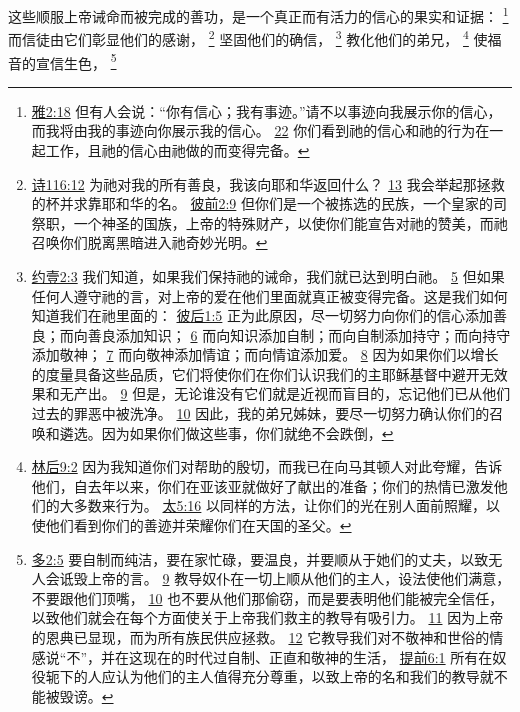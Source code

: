 \documentclass[12pt, a4paper, oneside]{ctexart}
\newcounter{parnum}[section]
\newcommand{\N}{%
   \noindent\refstepcounter{parnum}%
    \makebox[\parindent][l]{\textbf{\arabic{parnum}.}}}
\begin{document}
\N 这些顺服上帝诫命而被完成的善功，是一个真正而有活力的信心的果实和证据：
	\footnote {
		\href{https://biblehub.com/james/2-18.htm}{雅2:18} 但有人会说：“你有信心；我有事迹。”请不以事迹向我展示你的信心，而我将由我的事迹向你展示我的信心。
		\href{https://biblehub.com/james/2-22.htm}{22} 你们看到祂的信心和祂的行为在一起工作，且祂的信心由祂做的而变得完备。
	}
	而信徒由它们彰显他们的感谢，
	\footnote {
		\href{https://biblehub.com/psalms/116-12.htm}{诗116:12} 为祂对我的所有善良，我该向耶和华返回什么？
		\href{https://biblehub.com/psalms/116-13.htm}{13} 我会举起那拯救的杯并求靠耶和华的名。
		\href{https://biblehub.com/1_peter/2-9.htm}{彼前2:9} 但你们是一个被拣选的民族，一个皇家的司祭职，一个神圣的国族，上帝的特殊财产，以使你们能宣告对祂的赞美，而祂召唤你们脱离黑暗进入祂奇妙光明。
	}
	坚固他们的确信，
	\footnote {
		\href{https://biblehub.com/1_john/2-3.htm}{约壹2:3} 我们知道，如果我们保持祂的诫命，我们就已达到明白祂。
		\href{https://biblehub.com/1_john/2-5.htm}{5} 但如果任何人遵守祂的言，对上帝的爱在他们里面就真正被变得完备。这是我们如何知道我们在祂里面的：
		\href{https://biblehub.com/2_peter/1-5.htm}{彼后1:5} 正为此原因，尽一切努力向你们的信心添加善良；而向善良添加知识；
		\href{https://biblehub.com/2_peter/1-6.htm}{6} 而向知识添加自制；而向自制添加持守；而向持守添加敬神；
		\href{https://biblehub.com/2_peter/1-7.htm}{7} 而向敬神添加情谊；而向情谊添加爱。
		\href{https://biblehub.com/2_peter/1-8.htm}{8} 因为如果你们以增长的度量具备这些品质，它们将使你们在你们认识我们的主耶稣基督中避开无效果和无产出。
		\href{https://biblehub.com/2_peter/1-9.htm}{9} 但是，无论谁没有它们就是近视而盲目的，忘记他们已从他们过去的罪恶中被洗净。
		\href{https://biblehub.com/2_peter/1-10.htm}{10} 因此，我的弟兄姊妹，要尽一切努力确认你们的召唤和遴选。因为如果你们做这些事，你们就绝不会跌倒，
	}
	教化他们的弟兄，
	\footnote {
		\href{https://biblehub.com/2_corinthians/9-2.htm}{林后9:2} 因为我知道你们对帮助的殷切，而我已在向马其顿人对此夸耀，告诉他们，自去年以来，你们在亚该亚就做好了献出的准备；你们的热情已激发他们的大多数来行为。
		\href{https://biblehub.com/matthew/5-16.htm}{太5:16} 以同样的方法，让你们的光在别人面前照耀，以使他们看到你们的善迹并荣耀你们在天国的圣父。
	}
	使福音的宣信生色，
	\footnote {
		\href{https://biblehub.com/titus/2-5.htm}{多2:5} 要自制而纯洁，要在家忙碌，要温良，并要顺从于她们的丈夫，以致无人会诋毁上帝的言。
		\href{https://biblehub.com/titus/2-9.htm}{9} 教导奴仆在一切上顺从他们的主人，设法使他们满意，不要跟他们顶嘴，
		\href{https://biblehub.com/titus/2-10.htm}{10} 也不要从他们那偷窃，而是要表明他们能被完全信任，以致他们就会在每个方面使关于上帝我们救主的教导有吸引力。
		\href{https://biblehub.com/titus/2-11.htm}{11} 因为上帝的恩典已显现，而为所有族民供应拯救。
		\href{https://biblehub.com/titus/2-12.htm}{12} 它教导我们对不敬神和世俗的情感说“不”，并在这现在的时代过自制、正直和敬神的生活，
		\href{https://biblehub.com/1_timothy/6-1.htm}{提前6:1} 所有在奴役轭下的人应认为他们的主人值得充分尊重，以致上帝的名和我们的教导就不能被毁谤。
	}
\end{document}
